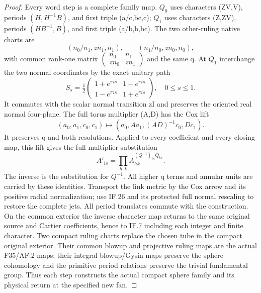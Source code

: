 \begin{proof}
Every word step is a complete family map.  \(Q_0\) uses characters
(ZV,V), periods \((H,H^{-1}B)\), and first triple (a/c,bc,c); \(Q_1\) uses
characters (Z,ZV), periods \((HB^{-1},B)\), and first triple (a/b,b,bc).
The two other-ruling native charts are
\[
 (n_0/n_1,zn_1,n_1),\qquad(n_1/n_0,zn_0,n_0),
 \tag{IF.34}
\]
with common rank-one matrix
\(\left(\begin{smallmatrix}n_0&n_1\\zn_0&zn_1\end{smallmatrix}\right)\)
and the same q.  At \(Q_1\) interchange the two normal coordinates by
the exact unitary path
\[
 S_s=\tfrac12\begin{pmatrix}
 1+e^{\pi i s}&1-e^{\pi i s}\\1-e^{\pi i s}&1+e^{\pi i s}
 \end{pmatrix},\quad0\le s\le1.
 \tag{IF.35}
\]
It commutes with the scalar normal transition zI and preserves the
oriented real normal four-plane.  The full torus multiplier (A,D)
has the Cox lift
\[
 (a_0,a_1,c_0,c_1)\longmapsto
                  (a_0,Aa_1,(AD)^{-1}c_0,Dc_1).
 \tag{IF.36}
\]
It preserves q and both resolutions.  Applied to every coefficient
and every closing map, this lift gives the full multiplier substitution
\[
 A'_{is}=\prod_{h,k}A_{hk}^{(Q^{-1})_{ih}Q_{ks}}.
 \tag{IF.37}
\]
The inverse is the substitution for \(Q^{-1}\).  All higher q terms and
annular units are carried by these identities.  Transport the link
metric by the Cox arrow and its positive radial normalization; use
IF.26 and its protected full normal rescaling to restore the complete
jets.  All period translates commute with the construction.  On the
common exterior the inverse character map returns to the same
original source and Cartier coefficients, hence to IF.7 including
each integer and finite character.  Two compact ruling charts replace
the chosen tube in the compact original exterior.  Their common
blowup and projective ruling maps are the actual F35/AF.2 maps; their
integral blowup/Gysin maps preserve the sphere cohomology and the
primitive period relations preserve the trivial fundamental group.
Thus each step constructs the actual compact sphere family and its
physical return at the specified new fan.


\end{proof}
